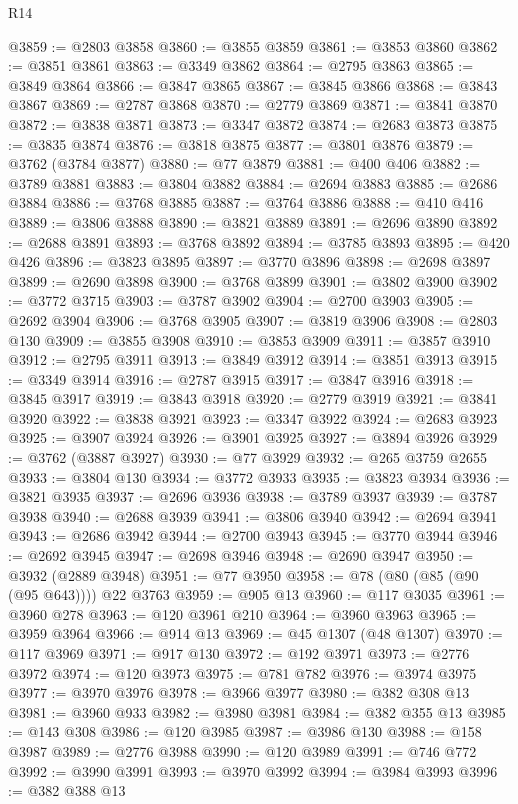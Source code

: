 \begin{lexlean}{R14}
\begin{coremodule}
@3859 := @2803 @3858
@3860 := @3855 @3859
@3861 := @3853 @3860
@3862 := @3851 @3861
@3863 := @3349 @3862
@3864 := @2795 @3863
@3865 := @3849 @3864
@3866 := @3847 @3865
@3867 := @3845 @3866
@3868 := @3843 @3867
@3869 := @2787 @3868
@3870 := @2779 @3869
@3871 := @3841 @3870
@3872 := @3838 @3871
@3873 := @3347 @3872
@3874 := @2683 @3873
@3875 := @3835 @3874
@3876 := @3818 @3875
@3877 := @3801 @3876
@3879 := @3762 (@3784 @3877)
@3880 := @77 @3879
@3881 := @400 @406
@3882 := @3789 @3881
@3883 := @3804 @3882
@3884 := @2694 @3883
@3885 := @2686 @3884
@3886 := @3768 @3885
@3887 := @3764 @3886
@3888 := @410 @416
@3889 := @3806 @3888
@3890 := @3821 @3889
@3891 := @2696 @3890
@3892 := @2688 @3891
@3893 := @3768 @3892
@3894 := @3785 @3893
@3895 := @420 @426
@3896 := @3823 @3895
@3897 := @3770 @3896
@3898 := @2698 @3897
@3899 := @2690 @3898
@3900 := @3768 @3899
@3901 := @3802 @3900
@3902 := @3772 @3715
@3903 := @3787 @3902
@3904 := @2700 @3903
@3905 := @2692 @3904
@3906 := @3768 @3905
@3907 := @3819 @3906
@3908 := @2803 @130
@3909 := @3855 @3908
@3910 := @3853 @3909
@3911 := @3857 @3910
@3912 := @2795 @3911
@3913 := @3849 @3912
@3914 := @3851 @3913
@3915 := @3349 @3914
@3916 := @2787 @3915
@3917 := @3847 @3916
@3918 := @3845 @3917
@3919 := @3843 @3918
@3920 := @2779 @3919
@3921 := @3841 @3920
@3922 := @3838 @3921
@3923 := @3347 @3922
@3924 := @2683 @3923
@3925 := @3907 @3924
@3926 := @3901 @3925
@3927 := @3894 @3926
@3929 := @3762 (@3887 @3927)
@3930 := @77 @3929
@3932 := @265 @3759 @2655
@3933 := @3804 @130
@3934 := @3772 @3933
@3935 := @3823 @3934
@3936 := @3821 @3935
@3937 := @2696 @3936
@3938 := @3789 @3937
@3939 := @3787 @3938
@3940 := @2688 @3939
@3941 := @3806 @3940
@3942 := @2694 @3941
@3943 := @2686 @3942
@3944 := @2700 @3943
@3945 := @3770 @3944
@3946 := @2692 @3945
@3947 := @2698 @3946
@3948 := @2690 @3947
@3950 := @3932 (@2889 @3948)
@3951 := @77 @3950
@3958 := @78 (@80 (@85 (@90 (@95 @643)))) @22 @3763
@3959 := @905 @13
@3960 := @117 @3035
@3961 := @3960 @278
@3963 := @120 @3961 @210
@3964 := @3960 @3963
@3965 := @3959 @3964
@3966 := @914 @13
@3969 := @45 @1307 (@48 @1307)
@3970 := @117 @3969
@3971 := @917 @130
@3972 := @192 @3971
@3973 := @2776 @3972
@3974 := @120 @3973
@3975 := @781 @782
@3976 := @3974 @3975
@3977 := @3970 @3976
@3978 := @3966 @3977
@3980 := @382 @308 @13
@3981 := @3960 @933
@3982 := @3980 @3981
@3984 := @382 @355 @13
@3985 := @143 @308
@3986 := @120 @3985
@3987 := @3986 @130
@3988 := @158 @3987
@3989 := @2776 @3988
@3990 := @120 @3989
@3991 := @746 @772
@3992 := @3990 @3991
@3993 := @3970 @3992
@3994 := @3984 @3993
@3996 := @382 @388 @13

\end{coremodule}
\end{lexlean}
